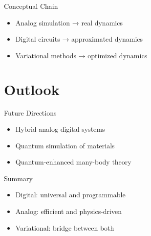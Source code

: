 \documentclass{beamer}
\begin{document}

\begin{frame}{Conceptual Chain}
\begin{itemize}
\item Analog simulation → real dynamics
\item Digital circuits → approximated dynamics
\item Variational methods → optimized dynamics
\end{itemize}
\end{frame}

\section{Outlook}

\begin{frame}{Future Directions}
\begin{itemize}
\item Hybrid analog-digital systems
\item Quantum simulation of materials
\item Quantum-enhanced many-body theory
\end{itemize}
\end{frame}


\begin{frame}{Summary}
\begin{itemize}
\item Digital: universal and programmable
\item Analog: efficient and physics-driven
\item Variational: bridge between both
\end{itemize}
\end{frame}
\end{document}
